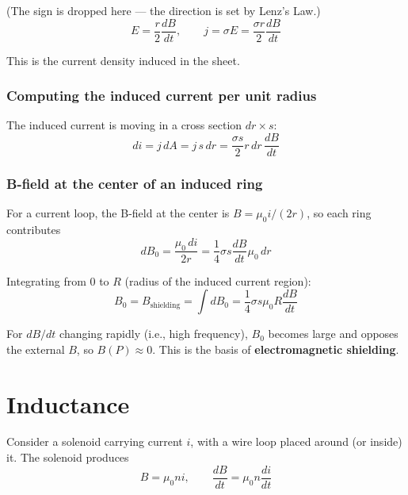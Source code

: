 \documentclass[11pt]{report}
\begin{document}
(The sign is dropped here --- the direction is set by Lenz's Law.)
\begin{equation}
E = \frac{r}{2}\frac{dB}{dt}, \qquad j = \sigma E = \frac{\sigma r}{2}\frac{dB}{dt}
\end{equation}

This is the current density induced in the sheet.

\subsubsection*{Computing the induced current per unit radius}

The induced current is moving in a cross section $dr \times s$:
\begin{equation}
di = j\, dA = j\, s\, dr = \frac{\sigma s}{2} r\, dr \,\frac{dB}{dt}
\end{equation}

\subsubsection*{B-field at the center of an induced ring}

For a current loop, the B-field at the center is $B = \mu_0 i / (2r)$, so each ring contributes
\begin{equation}
dB_0 = \frac{\mu_0 \, di}{2r} = \frac{1}{4}\sigma s \frac{dB}{dt}\mu_0 \, dr
\end{equation}

Integrating from $0$ to $R$ (radius of the induced current region):
\begin{equation}
B_0 = B_{\text{shielding}} = \int dB_0 = \frac{1}{4}\sigma s \mu_0 R \frac{dB}{dt}
\end{equation}

For $dB/dt$ changing rapidly (i.e., high frequency), $B_0$ becomes large and opposes the external $B$, so $B(P) \approx 0$. This is the basis of \textbf{electromagnetic shielding}.

\section{Inductance}

Consider a solenoid carrying current $i$, with a wire loop placed around (or inside) it. The solenoid produces
\begin{equation}
B = \mu_0 n i, \qquad \frac{dB}{dt} = \mu_0 n \frac{di}{dt}
\end{equation}
\end{document}

